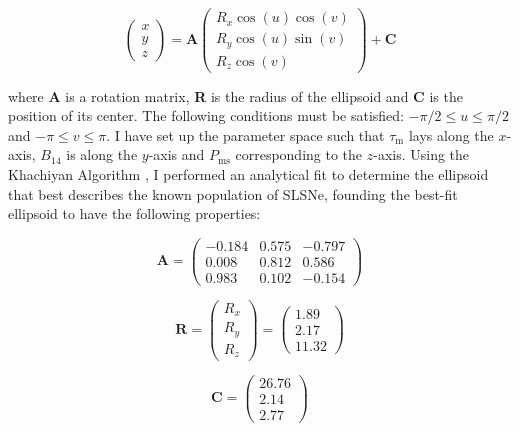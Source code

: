\begin{equation}
\label{eq:Ellipsoid}
\left( \begin{matrix}
x \\
y \\
z
\end{matrix} \right)
=
\mathbf{A}
\left( \begin{matrix}
R_x\cos(u)\cos(v) \\
R_y\cos(u)\sin(v) \\
R_z\cos(v)
\end{matrix} \right)
+ \mathbf{C}
\end{equation}

\noindent where \textbf{A} is a rotation matrix, \textbf{R} is the radius of the ellipsoid and \textbf{C} is the position of its center. The following conditions must be satisfied: $-\pi /2 \leq u \leq \pi /2$ and $-\pi \leq v \leq \pi$. I have set up the parameter space such that $\tau_\mathrm{m}$ lays along the $x$-axis, $B_{14}$ is along the $y$-axis and $P_{\mathrm{ms}}$ corresponding to the $z$-axis. Using the Khachiyan Algorithm \citep{Aspvall1980,Khachiyan1980}, I performed an analytical fit to determine the ellipsoid that best describes the known population of SLSNe, founding the best-fit ellipsoid to have the following properties:

\begin{equation}
\label{eq:A}
\mathbf{A} =
\left( \begin{matrix}
-0.184 & 0.575 & -0.797\\
 0.008 & 0.812 & 0.586\\
0.983 & 0.102 & -0.154
\end{matrix} \right)
\end{equation}

\begin{equation}
\label{eq:R}
\mathbf{R} =
\left( \begin{matrix}
R_x \\
R_y \\
R_z
\end{matrix} \right)
=
\left( \begin{matrix}
1.89\\
2.17\\
11.32
\end{matrix} \right)
\end{equation}

\begin{equation}
\label{eq:C}
\mathbf{C} =
\left( \begin{matrix}
26.76 \\
2.14\\
2.77
\end{matrix} \right)
\end{equation}

